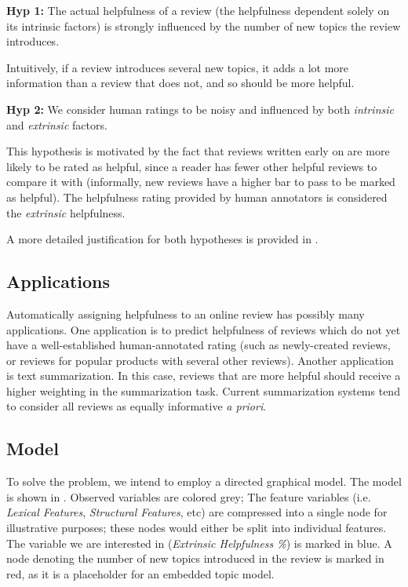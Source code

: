 \documentclass[letter,12pt]{article}
\begin{document}
{\bf Hyp 1:}  The actual helpfulness of a review (the helpfulness dependent solely on its intrinsic factors) is strongly influenced by the number of new topics the review introduces.

Intuitively, if a review introduces several new topics, it adds a lot more information than a review that does not, and so should be more helpful. 

{\bf Hyp 2:} We consider human ratings to be noisy and influenced by both {\em intrinsic} and {\em extrinsic} factors.

This hypothesis is motivated by the fact that reviews written early on are more likely to be rated as helpful, since a reader has fewer other helpful reviews to compare it with (informally, new reviews have a higher bar to pass to be marked as helpful).
The helpfulness rating provided by human annotators is considered the {\em extrinsic} helpfulness.

A more detailed justification for both hypotheses  is provided in .

\subsection{Applications}
Automatically assigning helpfulness to an online review has possibly many applications. One application is to predict helpfulness of reviews which do not yet have a well-established human-annotated rating (such as newly-created reviews, or reviews for popular products with several other reviews).  Another application is text summarization. In this case, reviews that are more helpful should receive a higher weighting in the summarization task. Current summarization systems tend to consider all reviews as  equally informative {\em a priori}.

\subsection{Model}

To solve the problem, we intend to employ a directed graphical model.
The model is shown in .
Observed variables are colored grey;
The feature variables (i.e. {\em Lexical Features}, {\em Structural Features}, 
	etc) are compressed into a single node for illustrative purposes;
	these nodes would either be split into individual features.
The variable we are interested in ({\em Extrinsic Helpfulness \%}) is marked
	in blue.
A node denoting the number of new topics introduced in the review is marked
	in red, as it is a placeholder for an embedded topic model.
\end{document}
